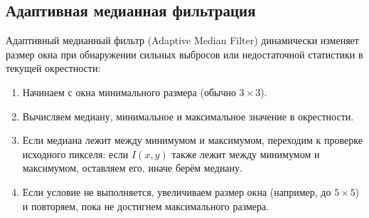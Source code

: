 \documentclass[a4paper,12pt]{article}
\begin{document}
\subsection{Адаптивная медианная фильтрация}
Адаптивный медианный фильтр (Adaptive Median Filter) динамически изменяет размер окна при обнаружении сильных выбросов или недостаточной статистики в текущей окрестности:
\begin{enumerate}
    \item Начинаем с окна минимального размера (обычно \(3\times 3\)).
    \item Вычисляем медиану, минимальное и максимальное значение в окрестности.
    \item Если медиана лежит между минимумом и максимумом, переходим к проверке исходного пикселя: если $I(x,y)$ также лежит между минимумом и максимумом, оставляем его, иначе берём медиану.
    \item Если условие не выполняется, увеличиваем размер окна (например, до \(5\times 5\)) и повторяем, пока не достигнем максимального размера.
\end{enumerate}
\end{document}
